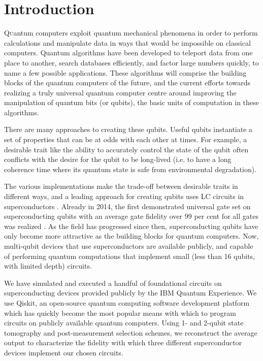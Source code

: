 \section{Introduction}

\lettrine[nindent=0em,lines=3]{Q} uantum computers exploit quantum mechanical
phenomena in order to perform calculations and manipulate data in ways that
would be impossible on classical computers. Quantum algorithms have been
developed to teleport data from one place to another, search databases
efficiently, and factor large numbers quickly, to name a few possible applications. These algorithms will comprise
the building blocks of the quantum computers of the future, and the current
efforts towards realizing a truly universal quantum computer centre around
improving the manipulation of quantum bits (or qubits), the basic units of
computation in these algorithms.

There are many approaches to creating these qubits. Useful qubits instantiate a
set of properties that can be at odds with each other at times. For example, a
desirable trait like the ability to accurately control the state of the qubit
often conflicts with the desire for the qubit to be long-lived (i.e. to have a
long coherence time where its quantum state is safe from environmental
degradation).

The various implementations make the trade-off between desirable traits in
different ways, and a leading approach for creating qubits uses LC circuits in
superconductors \cite{kjaergaard19_super_qubit}. Already in 2014, the first
demonstrated universal gate set on superconducting qubits with an average gate
fidelity over 99 per cent for all gates was realized
\cite{barends14_super_quant_circuit_at_surfac}. As the field has progressed
since then, superconducting qubits have only become more attractive as the
building blocks for quantum computers. Now, multi-qubit devices that use
superconductors are available publicly, and capable of performing quantum
computations that implement small (less than 16 qubits, with limited depth)
circuits.

We have simulated and executed a handful of foundational circuits on
superconducting devices provided publicly by the IBM Quantum Experience. We use
Qiskit, an open-source quantum computing software development
platform which has quickly become the most popular means with which to program
circuits on publicly available quantum computers. Using
1- and 2-qubit state tomography and post-measurement selection schemes, we
reconstruct the average output to characterize the fidelity with
which three different superconductor devices implement our chosen circuits.

